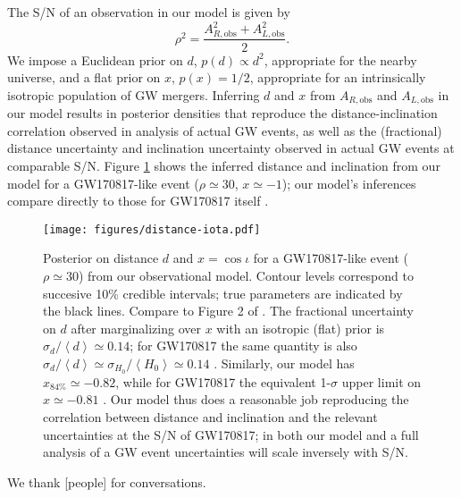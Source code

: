 \documentclass[modern]{aastex631}
\newcommand{\obs}{\mathrm{obs}}
\begin{document}
The S/N of an observation in our model is given by 
\begin{equation}
    \rho^2 = \frac{A_{R,\obs}^2 + A_{L,\obs}^2}{2}.
\end{equation}
We impose a Euclidean prior on $d$, $p(d) \propto d^2$, appropriate for the
nearby universe, and a flat prior on $x$, $p(x) = 1/2$, appropriate for an
intrinsically isotropic population of GW mergers.  Inferring $d$ and $x$ from
$A_{R,\obs}$ and $A_{L,\obs}$ in our model results in posterior densities that
reproduce the distance-inclination correlation observed in analysis of actual GW
events, as well as the (fractional) distance uncertainty and inclination
uncertainty observed in actual GW events at comparable S/N.  Figure
\ref{fig:distance-iota} shows the inferred distance and inclination from our
model for a GW170817-like event ($\rho \simeq 30$, $x \simeq -1$); our model's
inferences compare directly to those for GW170817 itself \citep{Abbott2017}.

\begin{figure}
    \texttt{[image: figures/distance-iota.pdf]}
    \caption{\label{fig:distance-iota} Posterior on distance $d$ and $x = \cos
    \iota$ for a GW170817-like event ($\rho \simeq 30$) from our observational
    model.  Contour levels correspond to succesive 10\% credible intervals; true
    parameters are indicated by the black lines.  Compare to Figure 2 of
    \citet{Abbott2017}.  The fractional uncertainty on $d$ after marginalizing
    over $x$ with an isotropic (flat) prior is $\sigma_d / \left\langle d
    \right\rangle \simeq 0.14$; for GW170817 the same quantity is also $\sigma_d
    / \left\langle d \right\rangle \simeq \sigma_{H_0} / \left\langle H_0
    \right\rangle \simeq 0.14$ \citep{Abbott2017}.  Similarly, our model has
    $x_{84\%} \simeq -0.82$, while for GW170817 the equivalent 1-$\sigma$ upper
    limit on $x \simeq -0.81$ \citep{Abbott2017}.  Our model thus does a
    reasonable job reproducing the correlation between distance and inclination
    and the relevant uncertainties at the S/N of GW170817; in both our model and
    a full analysis of a GW event uncertainties will scale inversely with S/N.}
\end{figure}

\begin{acknowledgments}
    We thank [people] for conversations.
\end{acknowledgments}



\end{document}
